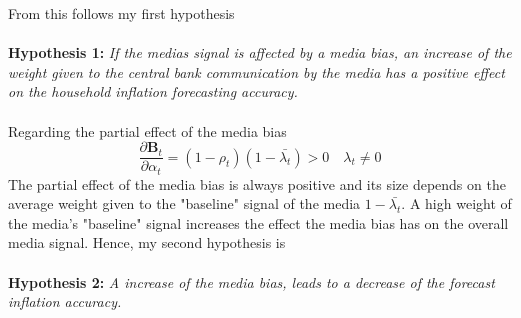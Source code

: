 \documentclass[review]{elsarticle}
\begin{document}
From this follows my first hypothesis
\\
\\
\textbf{Hypothesis 1:} \textit{If the medias signal is affected by a media bias, an increase of the weight given to the central bank communication by the media has a positive effect on the household inflation forecasting accuracy.} 
\\
\\
Regarding the partial effect of the media bias
\begin{equation}
\frac{\partial \mathbf{B}_t}{\partial \alpha_t} = (1-\rho_t) (1-\bar{\lambda_t}) > 0 \quad \lambda_t \neq 0
\end{equation}
The partial effect of the media bias is always positive and its size depends on the average weight given to the "baseline" signal of the media $1 - \bar{\lambda_t}$. A high weight of the media's "baseline" signal increases the effect the media bias has on the overall media signal. 
Hence, my second hypothesis is
\\
\\
\textbf{Hypothesis 2:} \textit{A increase of the media bias, leads to a decrease of the forecast inflation accuracy.}
\\
\end{document}
